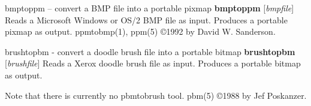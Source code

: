 \newpage
%

bmptoppm -- convert a BMP file into a portable pixmap
{\bf bmptoppm}
{\rm [}{\it bmpfile}{\rm ]}
Reads a Microsoft Windows or OS/2 BMP file as input.
Produces a portable pixmap as output.
ppmtobmp(1),
ppm(5)
\copyright 1992 by David W. Sanderson.
%
 
%

\newpage
%

brushtopbm - convert a doodle brush file into a portable bitmap
{\bf brushtopbm}
{\rm [}{\it brushfile}{\rm ]}
Reads a Xerox doodle brush file as input.
Produces a portable bitmap as output.
\par
Note that there is currently no pbmtobrush tool.
pbm(5)
\copyright 1988 by Jef Poskanzer.
%
 
